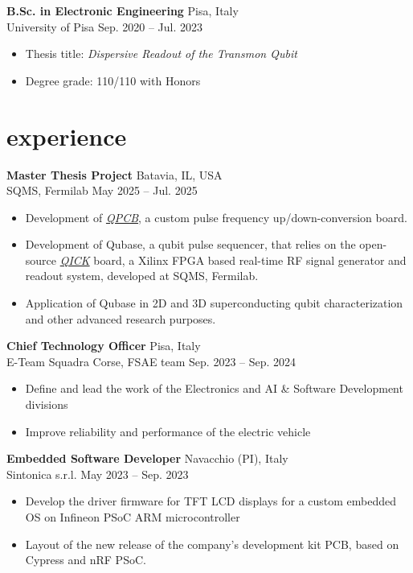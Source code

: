\documentclass[10pt]{article}
\newcommand{\entry}[4]{{{\textbf{#1}}} \hfill #3 \\ #2 \hfill #4}
\begin{document}
\smallskip

\entry{B.Sc. in Electronic Engineering}{University of Pisa}{Pisa, Italy}{Sep. 2020 -- Jul. 2023}
\begin{itemize}[noitemsep,leftmargin=3.5mm,rightmargin=0mm,topsep=6pt]
  \item Thesis title: \textit{Dispersive Readout of  the Transmon Qubit}
  \item Degree grade: 110/110 with Honors

\end{itemize}

\section{experience}

\entry{Master Thesis Project}{SQMS, Fermilab}{Batavia, IL, USA}{May 2025 -- Jul. 2025}
\begin{itemize}[noitemsep,leftmargin=3.5mm,rightmargin=0mm,topsep=6pt]
	\item Development of \textit{\href{https://github.com/leonardobove/qpcb}{QPCB}}, a custom pulse frequency up/down-conversion board.
	\item Development of Qubase, a qubit pulse sequencer, that relies on the open-source \textit{\href{https://github.com/openquantumhardware/qick}{QICK}} board, a Xilinx FPGA based real-time RF signal generator and readout system, developed at SQMS, Fermilab.
	\item Application of Qubase in 2D and 3D superconducting qubit characterization and other advanced research purposes.  
\end{itemize}

\smallskip

\entry{Chief Technology Officer}{E-Team Squadra Corse, FSAE team}{Pisa, Italy}{Sep. 2023 -- Sep. 2024}
\begin{itemize}[noitemsep,leftmargin=3.5mm,rightmargin=0mm,topsep=6pt]
    \item Define and lead the work of the Electronics and AI \& Software Development divisions
    \item Improve reliability and performance of the electric vehicle 
\end{itemize}

\smallskip

\entry{Embedded Software Developer}{Sintonica s.r.l.}{Navacchio (PI), Italy}{May 2023 -- Sep. 2023}
\begin{itemize}[noitemsep,leftmargin=3.5mm,rightmargin=0mm,topsep=6pt]
    \item Develop the driver firmware for TFT LCD displays for a custom embedded OS on Infineon PSoC ARM microcontroller
    \item Layout of the new release of the company's development kit PCB, based on Cypress and nRF PSoC.
\end{itemize}
\end{document}
